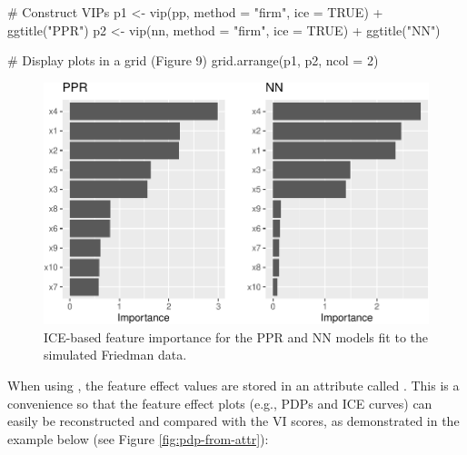 \begin{Schunk}
\begin{Sinput}
# Construct VIPs
p1 <- vip(pp, method = "firm", ice = TRUE) + ggtitle("PPR")
p2 <- vip(nn, method = "firm", ice = TRUE) + ggtitle("NN")

# Display plots in a grid (Figure 9)
grid.arrange(p1, p2, ncol = 2)
\end{Sinput}
\begin{figure}[!htb]

{\centering \includegraphics[width=0.7\linewidth]{greenwell-boehmke_files/figure-latex/vip-ice-ppr-nn-1}

}

\caption[ICE-based feature importance for the PPR and NN models fit to the simulated Friedman data]{ICE-based feature importance for the PPR and NN models fit to the simulated Friedman data.}\label{fig:vip-ice-ppr-nn}
\end{figure}
\end{Schunk}

When using , the feature effect values are stored
in an attribute called . This is a convenience so that
the feature effect plots (e.g., PDPs and ICE curves) can easily be
reconstructed and compared with the VI scores, as demonstrated in the
example below (see Figure \ref{fig:pdp-from-attr}):

